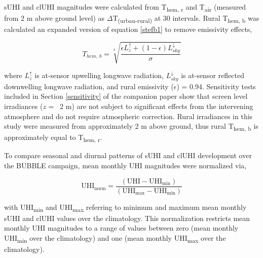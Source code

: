 \begin{bibunit}
sUHI and clUHI magnitudes were calculated from T\textsubscript{hem, r} and T\textsubscript{air} (measured from 2 \si{\meter} above ground level) as $\Delta$T\textsubscript{(urban-rural)} at 30 \si{\min} intervals. Rural T\textsubscript{hem, b} was calculated an expanded version of equation \ref{stefb1} to remove emissivity effects,

\begin{equation}
\label{ruralt}
T_{hem,~ b} = \sqrt[4]{\frac{\epsilon L_z^\uparrow + (1 - \epsilon)L_{sky}^\downarrow}{\sigma}}
\end{equation}

\noindent where $L_z^\uparrow$ is at-sensor upwelling longwave radiation, $L_{sky}^\downarrow$ is at-sensor reflected downwelling longwave radiation, and rural emissivity ($\epsilon$) = 0.94. Sensitivity tests included in Section \ref{sensitivity} of the companion paper show that screen level irradiances ($ z $ = ~2 \si{\meter}) are not subject to significant effects from the intervening atmosphere and do not require atmospheric correction. Rural irradiances in this study were measured from approximately 2 \si{\meter} above ground, thus rural T\textsubscript{hem, b} is approximately equal to T\textsubscript{hem, r}. 

To compare seasonal and diurnal patterns of sUHI and clUHI development over the BUBBLE campaign, mean monthly UHI magnitudes were normalized via,

\begin{equation}
\text{UHI}_{\text{norm}} = \frac{(\text{UHI} - \text{UHI}_{\text{min}})}{(\text{UHI}_{\text{max}} - \text{UHI}_{\text{min}})}
\label{uhinorm}
\end{equation}

\noindent with UHI\textsubscript{min} and UHI\textsubscript{max} referring to minimum and maximum mean monthly sUHI and clUHI values over the climatology. This normalization restricts mean monthly UHI magnitudes to a range of values between zero (mean monthly UHI\textsubscript{min} over the climatology) and one (mean monthly UHI\textsubscript{max} over the climatology).


\end{bibunit}
